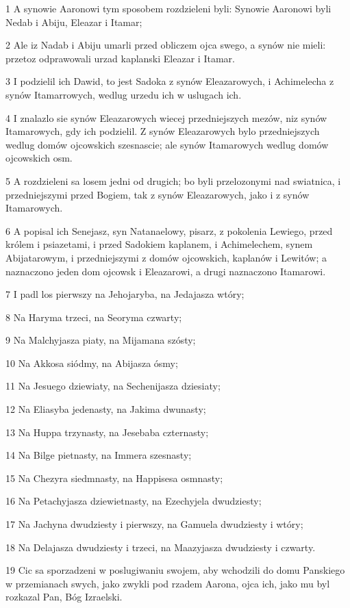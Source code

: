 \par 1 A synowie Aaronowi tym sposobem rozdzieleni byli: Synowie Aaronowi byli Nedab i Abiju, Eleazar i Itamar;
\par 2 Ale iz Nadab i Abiju umarli przed obliczem ojca swego, a synów nie mieli: przetoz odprawowali urzad kaplanski Eleazar i Itamar.
\par 3 I podzielil ich Dawid, to jest Sadoka z synów Eleazarowych, i Achimelecha z synów Itamarrowych, wedlug urzedu ich w uslugach ich.
\par 4 I znalazlo sie synów Eleazarowych wiecej przedniejszych mezów, niz synów Itamarowych, gdy ich podzielil. Z synów Eleazarowych bylo przedniejszych wedlug domów ojcowskich szesnascie; ale synów Itamarowych wedlug domów ojcowskich osm.
\par 5 A rozdzieleni sa losem jedni od drugich; bo byli przelozonymi nad swiatnica, i przedniejszymi przed Bogiem, tak z synów Eleazarowych, jako i z synów Itamarowych.
\par 6 A popisal ich Senejasz, syn Natanaelowy, pisarz, z pokolenia Lewiego, przed królem i psiazetami, i przed Sadokiem kaplanem, i Achimelechem, synem Abijatarowym, i przedniejszymi z domów ojcowskich, kaplanów i Lewitów; a naznaczono jeden dom ojcowsk i Eleazarowi, a drugi naznaczono Itamarowi.
\par 7 I padl los pierwszy na Jehojaryba, na Jedajasza wtóry;
\par 8 Na Haryma trzeci, na Seoryma czwarty;
\par 9 Na Malchyjasza piaty, na Mijamana szósty;
\par 10 Na Akkosa siódmy, na Abijasza ósmy;
\par 11 Na Jesuego dziewiaty, na Sechenijasza dziesiaty;
\par 12 Na Eliasyba jedenasty, na Jakima dwunasty;
\par 13 Na Huppa trzynasty, na Jesebaba czternasty;
\par 14 Na Bilge pietnasty, na Immera szesnasty;
\par 15 Na Chezyra siedmnasty, na Happisesa osmnasty;
\par 16 Na Petachyjasza dziewietnasty, na Ezechyjela dwudziesty;
\par 17 Na Jachyna dwudziesty i pierwszy, na Gamuela dwudziesty i wtóry;
\par 18 Na Delajasza dwudziesty i trzeci, na Maazyjasza dwudziesty i czwarty.
\par 19 Cic sa sporzadzeni w poslugiwaniu swojem, aby wchodzili do domu Panskiego w przemianach swych, jako zwykli pod rzadem Aarona, ojca ich, jako mu byl rozkazal Pan, Bóg Izraelski.
